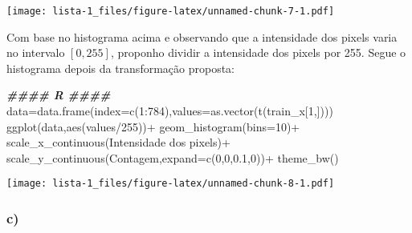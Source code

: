 \documentclass[
]{article}
\newenvironment{Shaded}{\begin{snugshade}}{\end{snugshade}}
\newcommand{\AttributeTok}[1]{\textcolor[rgb]{0.77,0.63,0.00}{#1}}
\newcommand{\DecValTok}[1]{\textcolor[rgb]{0.00,0.00,0.81}{#1}}
\newcommand{\DocumentationTok}[1]{\textcolor[rgb]{0.56,0.35,0.01}{\textbf{\textit{#1}}}}
\newcommand{\FloatTok}[1]{\textcolor[rgb]{0.00,0.00,0.81}{#1}}
\newcommand{\FunctionTok}[1]{\textcolor[rgb]{0.00,0.00,0.00}{#1}}
\newcommand{\NormalTok}[1]{#1}
\newcommand{\OtherTok}[1]{\textcolor[rgb]{0.56,0.35,0.01}{#1}}
\newcommand{\SpecialCharTok}[1]{\textcolor[rgb]{0.00,0.00,0.00}{#1}}
\newcommand{\StringTok}[1]{\textcolor[rgb]{0.31,0.60,0.02}{#1}}
\begin{document}
\texttt{[image: lista-1\_files/figure-latex/unnamed-chunk-7-1.pdf]}

Com base no histograma acima e observando que a intensidade dos pixels
varia no intervalo \([0,255]\), proponho dividir a intensidade dos
pixels por 255. Segue o histograma depois da transformação proposta:

\begin{Shaded}
\begin{Highlighting}[]
\DocumentationTok{\#\#\#\# R \#\#\#\#}
\NormalTok{data}\OtherTok{=}\FunctionTok{data.frame}\NormalTok{(}\AttributeTok{index=}\FunctionTok{c}\NormalTok{(}\DecValTok{1}\SpecialCharTok{:}\DecValTok{784}\NormalTok{),}\AttributeTok{values=}\FunctionTok{as.vector}\NormalTok{(}\FunctionTok{t}\NormalTok{(train\_x[}\DecValTok{1}\NormalTok{,])))}
\FunctionTok{ggplot}\NormalTok{(data,}\FunctionTok{aes}\NormalTok{(values}\SpecialCharTok{/}\DecValTok{255}\NormalTok{))}\SpecialCharTok{+}
  \FunctionTok{geom\_histogram}\NormalTok{(}\AttributeTok{bins=}\DecValTok{10}\NormalTok{)}\SpecialCharTok{+}
  \FunctionTok{scale\_x\_continuous}\NormalTok{(}\StringTok{\textquotesingle{}Intensidade dos pixels\textquotesingle{}}\NormalTok{)}\SpecialCharTok{+}
  \FunctionTok{scale\_y\_continuous}\NormalTok{(}\StringTok{\textquotesingle{}Contagem\textquotesingle{}}\NormalTok{,}\AttributeTok{expand=}\FunctionTok{c}\NormalTok{(}\DecValTok{0}\NormalTok{,}\DecValTok{0}\NormalTok{,}\FloatTok{0.1}\NormalTok{,}\DecValTok{0}\NormalTok{))}\SpecialCharTok{+}
  \FunctionTok{theme\_bw}\NormalTok{()}
\end{Highlighting}
\end{Shaded}

\texttt{[image: lista-1\_files/figure-latex/unnamed-chunk-8-1.pdf]}

\hypertarget{c-3}{%
\subsubsection{c)}\label{c-3}}
\end{document}

